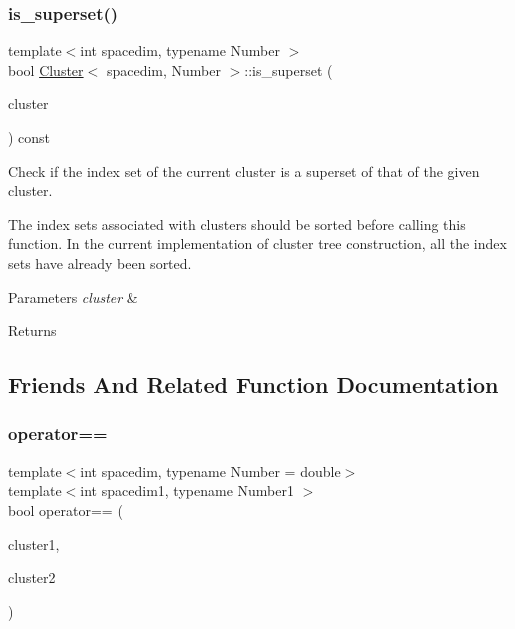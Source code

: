 \subsubsection{\texorpdfstring{is\+\_\+superset()}{is\_superset()}}
{\footnotesize\ttfamily template$<$int spacedim, typename Number $>$ \\
bool \hyperlink{classCluster}{Cluster}$<$ spacedim, Number $>$\+::is\+\_\+superset (\begin{DoxyParamCaption}\item[{const \hyperlink{classCluster}{Cluster}$<$ spacedim, Number $>$ \&}]{cluster }\end{DoxyParamCaption}) const}

Check if the index set of the current cluster is a superset of that of the given cluster.


\begin{DoxyDescription}
\item[Note ]The index sets associated with clusters should be sorted before calling this function. In the current implementation of cluster tree construction, all the index sets have already been sorted. 
\end{DoxyDescription}
\begin{DoxyParams}{Parameters}
{\em cluster} & \\
\hline
\end{DoxyParams}
\begin{DoxyReturn}{Returns}

\end{DoxyReturn}


\subsection{Friends And Related Function Documentation}
\mbox{\label{classCluster_a930aea4a53249004429d28f9631e495f}} 
\subsubsection{\texorpdfstring{operator==}{operator==}}
{\footnotesize\ttfamily template$<$int spacedim, typename Number = double$>$ \\
template$<$int spacedim1, typename Number1 $>$ \\
bool operator== (\begin{DoxyParamCaption}\item[{const \hyperlink{classCluster}{Cluster}$<$ spacedim1, Number1 $>$ \&}]{cluster1,  }\item[{const \hyperlink{classCluster}{Cluster}$<$ spacedim1, Number1 $>$ \&}]{cluster2 }\end{DoxyParamCaption})\hspace{0.3cm}{\ttfamily [friend]}}

